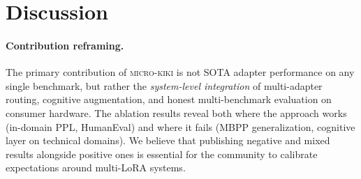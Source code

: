 \documentclass[11pt,a4paper]{article}
\begin{document}
\section{Discussion}
\label{sec:discussion}

\paragraph{Contribution reframing.}
The primary contribution of \textsc{micro-kiki} is not SOTA adapter performance on any single benchmark, but rather the \emph{system-level integration} of multi-adapter routing, cognitive augmentation, and honest multi-benchmark evaluation on consumer hardware. The ablation results reveal both where the approach works (in-domain PPL, HumanEval) and where it fails (MBPP generalization, cognitive layer on technical domains). We believe that publishing negative and mixed results alongside positive ones is essential for the community to calibrate expectations around multi-LoRA systems.
\end{document}
